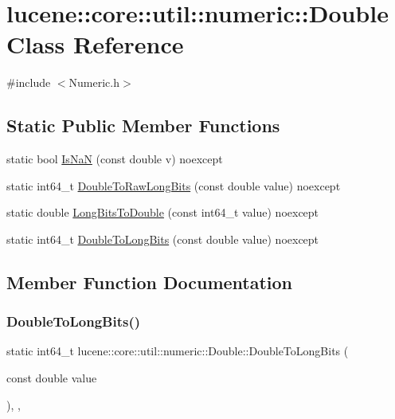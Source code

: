 \hypertarget{classlucene_1_1core_1_1util_1_1numeric_1_1Double}{}\section{lucene\+:\+:core\+:\+:util\+:\+:numeric\+:\+:Double Class Reference}
\label{classlucene_1_1core_1_1util_1_1numeric_1_1Double}


{\ttfamily \#include $<$Numeric.\+h$>$}

\subsection*{Static Public Member Functions}
\begin{DoxyCompactItemize}
\item 
static bool \mbox{\hyperlink{classlucene_1_1core_1_1util_1_1numeric_1_1Double_a90f6bdede8ad6bb030246fc9f63c001d}{Is\+NaN}} (const double v) noexcept
\item 
static int64\+\_\+t \mbox{\hyperlink{classlucene_1_1core_1_1util_1_1numeric_1_1Double_a9063631b5b6ca044176db4f86a9f0e19}{Double\+To\+Raw\+Long\+Bits}} (const double value) noexcept
\item 
static double \mbox{\hyperlink{classlucene_1_1core_1_1util_1_1numeric_1_1Double_adf20eb260f0f99ef904e88be601b15f5}{Long\+Bits\+To\+Double}} (const int64\+\_\+t value) noexcept
\item 
static int64\+\_\+t \mbox{\hyperlink{classlucene_1_1core_1_1util_1_1numeric_1_1Double_a565f2ddcd3f5f813656d54cf2f9b15c1}{Double\+To\+Long\+Bits}} (const double value) noexcept
\end{DoxyCompactItemize}


\subsection{Member Function Documentation}
\mbox{\label{classlucene_1_1core_1_1util_1_1numeric_1_1Double_a565f2ddcd3f5f813656d54cf2f9b15c1}} 
\subsubsection{\texorpdfstring{Double\+To\+Long\+Bits()}{DoubleToLongBits()}}
{\footnotesize\ttfamily static int64\+\_\+t lucene\+::core\+::util\+::numeric\+::\+Double\+::\+Double\+To\+Long\+Bits (\begin{DoxyParamCaption}\item[{const double}]{value }\end{DoxyParamCaption})\hspace{0.3cm}{\ttfamily [inline]}, {\ttfamily [static]}, {\ttfamily [noexcept]}}

